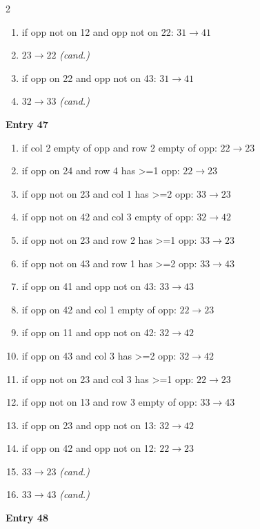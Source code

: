 \begin{multicols}{2}
\begin{tikzpicture}[scale=0.24]
\end{tikzpicture}
\nopagebreak\begin{enumerate}[topsep=1pt,itemsep=0pt,parsep=0pt,leftmargin=2.2em,label=\arabic*.]
\item if opp not on 12 and opp not on 22: $31\!\to\!41$
\item $23\!\to\!22$ \hfill\textit{(cand.)}
\item if opp on 22 and opp not on 43: $31\!\to\!41$
\item $32\!\to\!33$ \hfill\textit{(cand.)}
\end{enumerate}\smallskip
\noindent\textbf{Entry 47} \; 
\nopagebreak\begin{enumerate}[topsep=1pt,itemsep=0pt,parsep=0pt,leftmargin=2.2em,label=\arabic*.]
\item if col 2 empty of opp and row 2 empty of opp: $22\!\to\!23$
\item if opp on 24 and row 4 has >=1 opp: $22\!\to\!23$
\item if opp not on 23 and col 1 has >=2 opp: $33\!\to\!23$
\item if opp not on 42 and col 3 empty of opp: $32\!\to\!42$
\item if opp not on 23 and row 2 has >=1 opp: $33\!\to\!23$
\item if opp not on 43 and row 1 has >=2 opp: $33\!\to\!43$
\item if opp on 41 and opp not on 43: $33\!\to\!43$
\item if opp on 42 and col 1 empty of opp: $22\!\to\!23$
\item if opp on 11 and opp not on 42: $32\!\to\!42$
\item if opp on 43 and col 3 has >=2 opp: $32\!\to\!42$
\item if opp not on 23 and col 3 has >=1 opp: $22\!\to\!23$
\item if opp not on 13 and row 3 empty of opp: $33\!\to\!43$
\item if opp on 23 and opp not on 13: $32\!\to\!42$
\item if opp on 42 and opp not on 12: $22\!\to\!23$
\item $33\!\to\!23$ \hfill\textit{(cand.)}
\item $33\!\to\!43$ \hfill\textit{(cand.)}
\end{enumerate}\smallskip
\noindent\textbf{Entry 48} \; 
\end{multicols}
